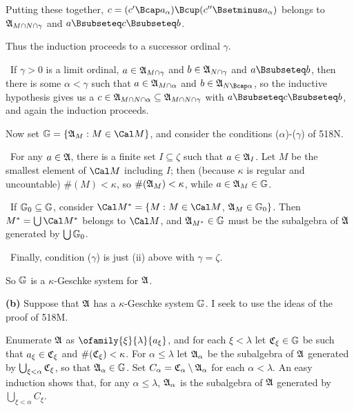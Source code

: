 {\noindent Putting these together,
$c=(c'\Bcap a_{\alpha})\Bcup(c''\Bsetminus a_{\alpha})$ belongs to
$\frak A_{M\cap N\cap\gamma}$ and $a\Bsubseteq c\Bsubseteq b$.

Thus the induction proceeds to a successor ordinal $\gamma$.

\medskip

\qquad\grheadc\ If $\gamma>0$ is a limit ordinal,
$a\in\frak A_{M\cap\gamma}$ and $b\in\frak A_{N\cap\gamma}$ and
$a\Bsubseteq b$, then there is some $\alpha<\gamma$ such that $a\in\frak
A_{M\cap\alpha}$ and $b\in\frak A_{N\Bcap\alpha}$, so the inductive
hypothesis gives us a
$c\in\frak A_{M\cap N\cap\alpha}\subseteq\frak A_{M\cap N\cap\gamma}$
with $a\Bsubseteq c\Bsubseteq b$, and again the induction proceeds.\
\Qed

\medskip

 Now set $\Bbb G=\{\frak A_M:M\in\Cal M\}$, and consider
the conditions ($\alpha$)-($\gamma$) of 518N.

\medskip

\qquad\grheada\ For any $a\in\frak A$, there is a finite set
$I\subseteq\zeta$ such that $a\in\frak A_I$.   Let $M$ be the smallest
element of $\Cal M$ including $I$;  then (because $\kappa$ is regular
and uncountable) $\#(M)<\kappa$, so $\#(\frak A_M)<\kappa$, while
$a\in\frak A_M\in\Bbb G$.

\medskip

\qquad\grheadb\ If $\Bbb G_0\subseteq\Bbb G$, consider
$\Cal M^*=\{M:M\in\Cal M$, $\frak A_M\in\Bbb G_0\}$.   Then
$M^*=\bigcup\Cal M^*$ belongs to $\Cal M$, and $\frak A_{M^*}\in\Bbb G$
must be the subalgebra of $\frak A$ generated by $\bigcup\Bbb G_0$.

\medskip

\qquad\grheadc\ Finally, condition ($\gamma$) is just (ii) above with
$\gamma=\zeta$.

So $\Bbb G$ is a $\kappa$-Geschke system for $\frak A$.

\medskip

{\bf (b)} Suppose that $\frak A$ has a $\kappa$-Geschke system
$\Bbb G$.   I seek to use the ideas of the proof of 518M.

\medskip

 Enumerate $\frak A$ as $\ofamily{\xi}{\lambda}{a_{\xi}}$,
and for each $\xi<\lambda$ let $\frak C_{\xi}\in\Bbb G$ be such that
$a_{\xi}\in\frak C_{\xi}$ and $\#(\frak C_{\xi})<\kappa$.   For
$\alpha\le\lambda$ let $\frak A_{\alpha}$ be the subalgebra of $\frak A$
generated by $\bigcup_{\xi<\alpha}\frak C_{\xi}$, so that
$\frak A_{\alpha}\in\Bbb G$.   Set
$C_{\alpha}=\frak C_{\alpha}\setminus\frak A_{\alpha}$ for each
$\alpha<\lambda$.   An easy induction shows that, for any
$\alpha\le\lambda$, $\frak A_{\alpha}$ is the subalgebra of $\frak A$
generated by $\bigcup_{\xi<\alpha}C_{\xi}$.

}
